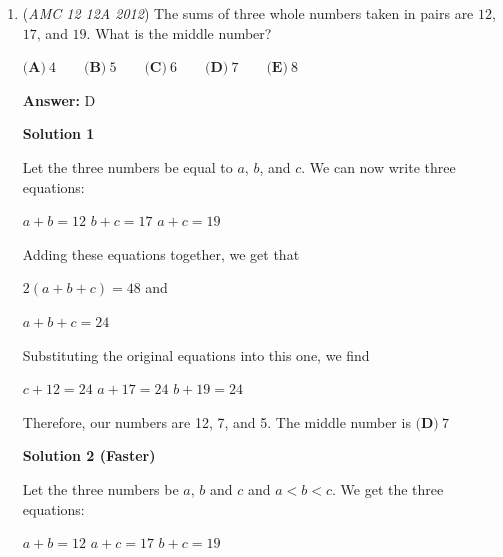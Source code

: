\begin{enumerate}
 Observe that since there are $280$ pieces of fruit,
 \[b+r+g+c=280.\]

 Since there are twice as many raspberries as blueberries,
 \[2b=r.\]

 The fact that there are three times as many grapes as cherries implies,
 \[3c=g.\]

 Because there are four times as many cherries as raspberries, we deduce the following:
 \[4r=c.\]

 Note that we are looking for $c.$  So, we try to rewrite all of the other variables in terms of $c.$The third equation gives us the value of $g$ in terms of $c$ already.  We divide the fourth equation by $4$ to get that $r=\frac{c}{4}.$  Finally, substituting this value of $r$ into the first equation provides us with the equation $b=\frac{c}{8}$ and substituting yields:
 \[\frac{c}{4}+\frac{c}{8}+3c+c=280\]Multiply this equation by $8$ to get:
 \[2c+c+24c+8c=8\cdot 280,\]
 \[35c=8\cdot 280,\]
 \[c=64.\]
 \[\boxed{D}\]



	\item (\textit{AMC 12 12A 2012}) The sums of three whole numbers taken in pairs are $12$, $17$, and $19$.  What is the middle number?


 $\textbf{(A)}\ 4\qquad\textbf{(B)}\ 5\qquad\textbf{(C)}\ 6\qquad\textbf{(D)}\ 7\qquad\textbf{(E)}\ 8$

 \textbf{Answer: }D



\textbf{Solution 1}

Let the three numbers be equal to $a$, $b$, and $c$. We can now write three equations:

 $a+b=12$
$b+c=17$
$a+c=19$

 Adding these equations together, we get that

 $2(a+b+c)=48$ and

 $a+b+c=24$

 Substituting the original equations into this one, we find

 $c+12=24$
$a+17=24$
$b+19=24$

 Therefore, our numbers are 12, 7, and 5. The middle number is $\boxed{\textbf{(D)}\ 7}$




\textbf{Solution 2 (Faster)}

Let the three numbers be $a$, $b$ and $c$ and $a<b<c$. We get the three equations: 

 $a+b=12$
$a+c=17$
$b+c=19$


\end{enumerate}
